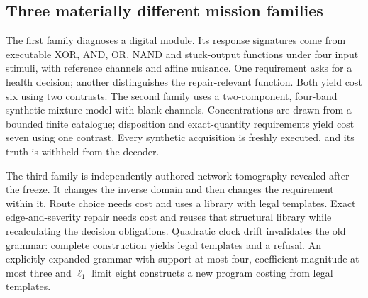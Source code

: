 \documentclass[11pt,letterpaper]{article}
\theoremstyle{definition}\newtheorem{definition}[theorem]{Definition}
\theoremstyle{remark}\newtheorem{remark}[theorem]{Remark}
\begin{document}
\subsection{Three materially different mission families}
The first family diagnoses a digital module. Its response signatures come from executable XOR, AND, OR, NAND and stuck-output functions under four input stimuli, with reference channels and affine nuisance. One requirement asks for a health decision; another distinguishes the repair-relevant function. Both yield cost six using two contrasts. The second family uses a two-component, four-band synthetic mixture model with blank channels. Concentrations are drawn from a bounded finite catalogue; disposition and exact-quantity requirements yield cost seven using one contrast. Every synthetic acquisition is freshly executed, and its truth is withheld from the decoder.

The third family is independently authored network tomography revealed after the freeze. It changes the inverse domain and then changes the requirement within it. Route choice needs cost \HoldoutRouteCost{} and uses a library with \HoldoutRouteTemplates{} legal templates. Exact edge-and-severity repair needs cost \HoldoutRepairCost{} and reuses that structural library while recalculating the decision obligations. Quadratic clock drift invalidates the old grammar: complete construction yields \HoldoutInvalidTemplates{} legal templates and a refusal. An explicitly expanded grammar with support at most four, coefficient magnitude at most three and \(\ell_1\) limit eight constructs a new program costing \HoldoutRebuiltCost{} from \HoldoutRebuiltTemplates{} legal templates.
\end{document}
